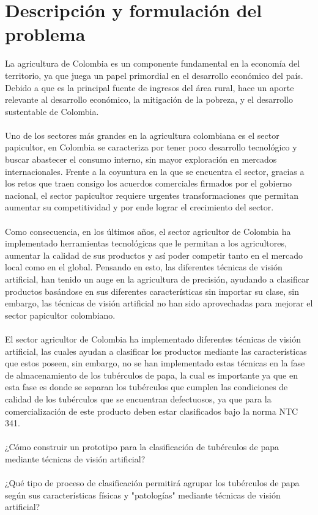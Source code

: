 \section{Descripción y formulación del problema}
La agricultura de Colombia es un componente fundamental en la economía del territorio, ya que juega un papel primordial en el desarrollo económico del país. Debido a que es la principal fuente de ingresos del área rural, hace un aporte relevante al desarrollo económico, la mitigación de la pobreza, y el desarrollo sustentable de Colombia.
\\
\\
Uno de los sectores más grandes en la agricultura colombiana es el sector papicultor, en Colombia se caracteriza por tener poco desarrollo tecnológico y buscar abastecer el consumo interno, sin mayor exploración en mercados internacionales. Frente a la coyuntura en la que se encuentra el sector, gracias a los retos que traen consigo los acuerdos comerciales firmados por el gobierno nacional, el sector papicultor requiere urgentes transformaciones que permitan aumentar su competitividad y por ende lograr el crecimiento del sector.
\\
\\
Como consecuencia, en los últimos años, el sector agricultor de Colombia ha implementado herramientas tecnológicas que le permitan a los agricultores, aumentar la calidad de sus productos y así poder competir tanto en el mercado local como en el global. Pensando en esto, las diferentes técnicas de visión artificial, han tenido un auge en la agricultura de precisión, ayudando a clasificar productos basándose en sus diferentes características sin importar su clase, sin embargo, las técnicas de visión artificial no han sido aprovechadas para mejorar el sector papicultor colombiano.
\\
\\
El sector agricultor de Colombia ha implementado diferentes técnicas de visión artificial, las cuales ayudan a clasificar los productos mediante las características que estos poseen, sin embargo, no se han implementado estas técnicas en la fase de almacenamiento de los tubérculos de papa, la cual es importante ya que en esta fase es donde se separan los tubérculos que cumplen las condiciones de calidad de los tubérculos que se encuentran defectuosos, ya que para la comercialización de este producto deben estar clasificados bajo la norma NTC 341.
\\
\\ 
¿Cómo construir un prototipo para la clasificación de tubérculos de papa mediante técnicas de visión artificial?
\\
\\
¿Qué tipo de proceso de clasificación permitirá agrupar los tubérculos de papa según sus características físicas y "patologías" mediante técnicas de visión artificial?	


